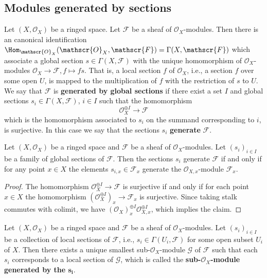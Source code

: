 \subsection{Modules generated by sections}
Let $(X,\mathscr{O}_X)$ be a ringed space. Let $\mathscr{F}$ be a sheaf of $\mathscr{O}_X$-modules. Then there is an canonical identification $\Hom_{\mathscr{O}_X}(\mathscr{O}_{X},\mathscr{F})=\Gamma(X,\mathscr{F})$ which associate a global section $s\in\Gamma(X,\mathscr{F})$ with the unique homomorphism of $\mathscr{O}_X$-modules $\mathscr{O}_X\to\mathscr{F},f\mapsto fs$. That is, a local section $f$ of $\mathscr{O}_X$, i.e., a section $f$ over some open $U$, is mapped to the multiplication of $f$ with the restriction of $s$ to $U$. We say that $\mathscr{F}$ is \textbf{generated by global sections} if there exist a set $I$ and global sections $s_i\in\Gamma(X,\mathscr{F})$, $i\in I$ such that the homomorphism
\[\mathscr{O}_X^{\oplus I}\to\mathscr{F}\]
which is the homomorphism associated to $s_i$ on the summand corresponding to $i$, is surjective. In this case we say that the sections $s_i$ \textbf{generate} $\mathscr{F}$.
\begin{proposition}\label{sheaf of module global section generate iff}
Let $(X,\mathscr{O}_X)$ be a ringed space and $\mathscr{F}$ be a sheaf of $\mathscr{O}_X$-modules. Let $(s_i)_{i\in I}$ be a family of global sections of $\mathscr{F}$. Then the sections $s_i$ generate $\mathscr{F}$ if and only if for any point $x\in X$ the elements $s_{i,x}\in\mathscr{F}_x$ generate the $\mathscr{O}_{X,x}$-module $\mathscr{F}_x$.
\end{proposition}
\begin{proof}
The homomorphism $\mathscr{O}_X^{\oplus I}\to\mathscr{F}$ is surjective if and only if for each point $x\in X$ the homomorphism $(\mathscr{O}_{X}^{\oplus I})_x\to\mathscr{F}_x$ is surjective. Since taking stalk commutes with colimit, we have $(\mathscr{O}_X)^{\oplus I}_x\mathscr{O}_{X,x}^{\oplus I}$, which implies the claim.
\end{proof}
\begin{proposition}\label{sheaf of module local section generate subsheaf}
Let $(X,\mathscr{O}_X)$ be a ringed space and $\mathscr{F}$ be a sheaf of $\mathscr{O}_X$-modules. Let $(s_i)_{i\in I}$ be a collection of local sections of $\mathscr{F}$, i.e., $s_i\in\Gamma(U_i,\mathscr{F})$ for some open subset $U_i$ of $X$. Then there exists a unique smallest sub-$\mathscr{O}_X$-module $\mathscr{G}$ of $\mathscr{F}$ such that each $s_i$ corresponds to a local section of $\mathscr{G}$, which is called the \textbf{sub-$\mathscr{O}_X$-module generated by the $\bm{s_{i}}$}.
\end{proposition}
